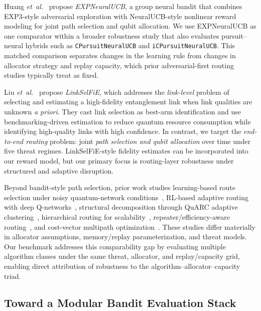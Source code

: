 \documentclass[10pt,conference]{IEEEtran}
\newcommand{\etal}{\emph{et~al.}\xspace}
\begin{document}
Huang \etal~\cite{huang2024quantum} propose \emph{EXPNeuralUCB}, a group neural bandit that combines EXP3-style adversarial exploration with NeuralUCB-style nonlinear reward modeling for joint path selection and qubit allocation. We use EXPNeuralUCB as one comparator within a broader robustness study that also evaluates pursuit--neural hybrids such as \texttt{CPursuitNeuralUCB} and \texttt{iCPursuitNeuralUCB}. This matched comparison separates changes in the learning rule from changes in allocator strategy and replay capacity, which prior adversarial-first routing studies typically treat as fixed.

Liu \etal~\cite{10621263} propose \emph{LinkSelFiE}, which addresses the \emph{link-level} problem of selecting and estimating a high-fidelity entanglement link when link qualities are unknown \emph{a priori}. They cast link selection as best-arm identification and use benchmarking-driven estimation to reduce quantum resource consumption while identifying high-quality links with high confidence. In contrast, we target the \emph{end-to-end routing} problem: joint \emph{path selection and qubit allocation} over time under five threat regimes. LinkSelFiE-style fidelity estimates can be incorporated into our reward model, but our primary focus is routing-layer robustness under structured and adaptive disruption.

Beyond bandit-style path selection, prior work studies learning-based route selection under noisy quantum-network conditions~\cite{chaudhary2023quantum}, RL-based adaptive routing with deep Q-networks~\cite{jallowkhan2025adaptive}, structural decomposition through QuARC adaptive clustering~\cite{clayton2024quarc}, hierarchical routing for scalability~\cite{cicconetti2024scalable}, repeater/efficiency-aware routing~\cite{kumar2024routing}, and cost-vector multipath optimization~\cite{leone2021costvector}. These studies differ materially in allocator assumptions, memory/replay parameterization, and threat models. Our benchmark addresses this comparability gap by evaluating multiple algorithm classes under the same threat, allocator, and replay/capacity grid, enabling direct attribution of robustness to the algorithm--allocator--capacity triad.

\subsection{Toward a Modular Bandit Evaluation Stack}
\end{document}
